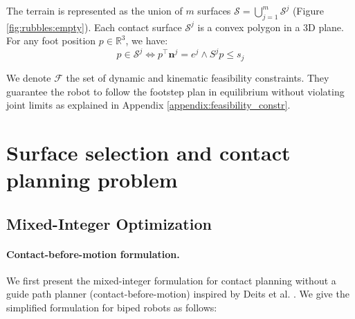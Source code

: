 The terrain is represented as the union of $m$ surfaces $\mathcal{S}= \bigcup_{j=1}^m \mathcal{S}^j$ (Figure \ref{fig:rubbles:empty}). 
Each contact surface $\mathcal{S}^j$ is a convex polygon in a 3D plane. 
For any foot position $p \in \mathbb{R}^{3}$, we have:
\begin{equation}
\label{eq:p_in_S}
    p \in \mathcal{S}^j \iff  p^{\intercal} \textbf{n}^j = e^j \land S^j p \leq s_j 
\end{equation}

We denote $\mathcal{F}$ the set of dynamic and kinematic feasibility constraints. 
They guarantee the robot to follow the footstep plan in equilibrium without violating joint limits as explained in Appendix \ref{appendix:feasibility_constr}.



\section{Surface selection and contact planning problem\label{sub:mip:mip}}

\subsection{Mixed-Integer Optimization}
\paragraph{Contact-before-motion formulation.\label{par:cbm:formulation}}
We first present the mixed-integer formulation for contact planning without a guide path planner (contact-before-motion) inspired by Deits et al. \cite{deits2014FootPlanMI}. 
We give the simplified formulation for biped robots as follows:

